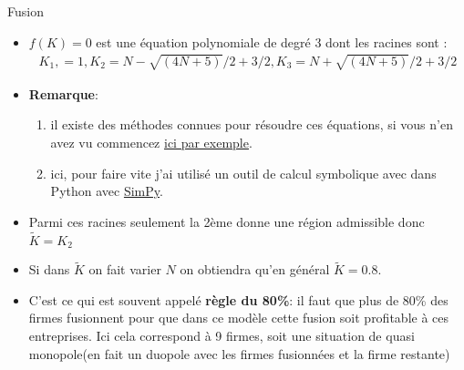 \begin{frame}[allowframebreaks]{Fusion}
\begin{itemize}
    \item $f(K) = 0$ est une équation polynomiale de degré 3 dont les racines sont :
    \begin{align*}
        K_1, =1, K_2 = N - \sqrt{(4N + 5)}/2 + 3/2, K_3 = N + \sqrt{(4N + 5)}/2 + 3/2
    \end{align*}
    \item \textbf{Remarque}: 
    \begin{enumerate}[$\star$]
    \item il existe des méthodes connues pour résoudre ces équations, si vous n'en avez 
    vu commencez \href{https://www.lucaswillems.com/fr/articles/58/equations-troisieme-degre?cache=update}{ici par exemple}.
    \item ici, pour faire vite j'ai utilisé un outil de calcul symbolique avec dans Python avec 
    \href{https://www.sympy.org/en/index.html}{SimPy}.
    \end{enumerate}
    \item Parmi ces racines seulement la 2ème donne une région admissible donc $\tilde{K}=K_2$
    \item Si dans $\tilde{K}$ on fait varier $N$ on obtiendra qu'en général $\tilde{K}=0.8$.
    \item C'est ce qui est souvent appelé \textbf{règle du 80\%}: il faut que plus de 80\% des firmes fusionnent 
    pour que dans ce modèle cette fusion soit profitable à ces entreprises. Ici cela correspond à 9 firmes, 
    soit une situation de quasi monopole(en fait un duopole avec les firmes fusionnées et la firme restante)
\end{itemize}
\end{frame}

